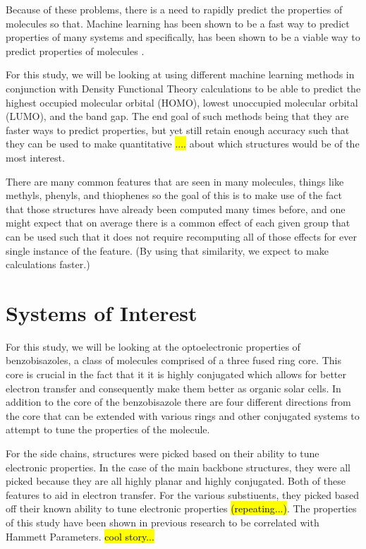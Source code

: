 \documentclass[10pt]{article}
\begin{document}
Because of these problems, there is a need to rapidly predict the properties of molecules so that. Machine learning has been shown to be a fast way to predict properties of many systems and specifically, has been shown to be a viable way to predict properties of molecules\cite{hansen_assessment_2013} \cite{montavon_machine_2013}.

For this study, we will be looking at using different machine learning methods in conjunction with Density Functional Theory calculations to be able to predict the highest occupied molecular orbital (HOMO), lowest unoccupied molecular orbital (LUMO), and the band gap. The end goal of such methods being that they are faster ways to predict properties, but yet still retain enough accuracy such that they can be used to make quantitative \hl{....} about which structures would be of the most interest.

There are many common features that are seen in many molecules, things like methyls, phenyls, and thiophenes so the goal of this is to make use of the fact that those structures have already been computed many times before, and one might expect that on average there is a common effect of each given group that can be used such that it does not require recomputing all of those effects for ever single instance of the feature. (By using that similarity, we expect to make calculations faster.)


\section{Systems of Interest}

For this study, we will be looking at the optoelectronic properties of benzobisazoles, a class of molecules comprised of a three fused ring core. This core is crucial in the fact that it it is highly conjugated which allows for better electron transfer and consequently make them better as organic solar cells. In addition to the core of the benzobisazole there are four different directions from the core that can be extended with various rings and other conjugated systems to attempt to tune the properties of the molecule.

For the side chains, structures were picked based on their ability to tune electronic properties. In the case of the main backbone structures, they were all picked because they are all highly planar and highly conjugated. Both of these features to aid in electron transfer. For the various substiuents, they picked based off their known ability to tune electronic properties \hl{(repeating...)}. The properties of this study have been shown in previous research to be correlated with Hammett Parameters. \hl{cool story...}
\end{document}

